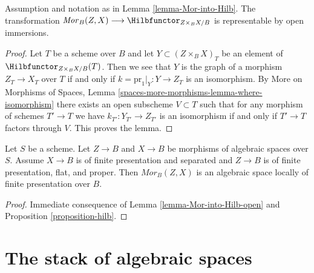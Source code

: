 \begin{lemma}
\label{lemma-Mor-into-Hilb-open}
Assumption and notation as in Lemma \ref{lemma-Mor-into-Hilb}.
The transformation
$\mathit{Mor}_B(Z, X) \longrightarrow \Hilbfunctor_{Z \times_B X/B}$
is representable by open immersions.
\end{lemma}

\begin{proof}
Let $T$ be a scheme over $B$ and let $Y \subset (Z \times_B X)_T$
be an element of $\Hilbfunctor_{Z \times_B X/B}(T)$. Then we see that
$Y$ is the graph of a morphism $Z_T \to X_T$ over $T$ if and only
if $k = \text{pr}_1|_Y : Y \to Z_T$ is an isomorphism. By
More on Morphisms of Spaces, Lemma
\ref{spaces-more-morphisms-lemma-where-isomorphism}
there exists an open subscheme $V \subset T$ such that
for any morphism of schemes $T' \to T$ we have
$k_{T'} : Y_{T'} \to Z_{T'}$ is an isomorphism if and
only if $T' \to T$ factors through $V$.
This proves the lemma.
\end{proof}

\begin{proposition}
\label{proposition-Mor}
Let $S$ be a scheme. Let $Z \to B$ and $X \to B$ be morphisms of algebraic
spaces over $S$. Assume $X \to B$ is of finite presentation and separated and
$Z \to B$ is of finite presentation, flat, and proper. Then
$\mathit{Mor}_B(Z, X)$ is an algebraic space locally of finite
presentation over $B$.
\end{proposition}

\begin{proof}
Immediate consequence of
Lemma \ref{lemma-Mor-into-Hilb-open}
and Proposition \ref{proposition-hilb}.
\end{proof}








\section{The stack of algebraic spaces}
\label{section-stack-of-spaces}

